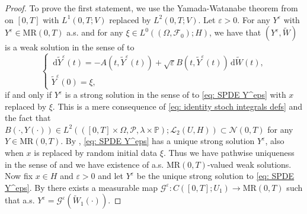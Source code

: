 \documentclass{amsart}
\newcommand{\dd}{\,\mathrm{d}}
\renewcommand{\MR}{\mathrm{MR}}
\newcommand{\UH}{\mathcal{L}_2(U,H)}
\newcommand{\<}{\langle}
\newcommand{\?}{\rangle}
\theoremstyle{plain}
\theoremstyle{remark}
\theoremstyle{plain}
\numberwithin{equation}{section}
\newcommand{\F}{\mathcal{F}}
\renewcommand{\P}{\mathbb{P}}
\newcommand{\PP}{\mathcal{P}}
\newcommand{\Om}{\Omega}
\newcommand{\eps}{\varepsilon}
\begin{document}
\begin{proof}
To prove the first statement, we use the Yamada-Watanabe theorem from \cite[Th. 2.1]{rock08}  on $[0,T]$
with $L^1(0,T;V)$ replaced by $L^2(0,T;V)$.
Let $\eps>0$.  For any $Y^\eps$ with $Y^\eps\in\MR(0,T)$ a.s. \!and for any $\xi\in L^0((\Om,\F_0);H)$, we have that $(Y^\eps, \tilde{W})$ is a weak solution in the sense of \cite[Def. 1.4]{rock08} to
\begin{equation*}
  \begin{cases}
    \dd \tilde{Y}^\eps(t)=-A(t,\tilde{Y}^\eps(t))+\sqrt{\eps}B(t,\tilde{Y}^\eps(t))\dd \tilde{W}(t),\\
    \tilde{Y}^\eps(0)=\xi,
  \end{cases}
\end{equation*}
if and only if $Y^\eps$ is a strong solution in the sense of \cite[Def. 3.2]{AV22variational} to \eqref{eq: SPDE Y^eps} with $x$ replaced by $\xi$. This is a mere consequence of \eqref{eq: identity stoch integrals defs}
and the fact that $B(\cdot,Y(\cdot))\in  L^2(([0,T]\times\Om,\PP,\lambda\times \P);\UH)\subset\mathcal{N}(0,T)$ for any $Y\in \MR(0,T)$. By \cite[Th. 3.5]{AV22variational}, \eqref{eq: SPDE Y^eps} has a unique strong solution $Y^\eps$, also when $x$ is replaced by random initial data $\xi$. Thus we have pathwise uniqueness in the sense of \cite[Def. 1.7]{rock08} and we have existence of a.s. \!$\MR(0,T)$-valued weak solutions.
Now fix $x\in H$ and  $\eps>0$ and let $Y^\eps$ be the unique strong solution to \eqref{eq: SPDE Y^eps}. By \cite[Th. 2.1, Def. 1.9(2), Def. 1.8]{rock08}
there exists a measurable map $\mathcal{G}^\eps\colon C([0,T];U_1)\to \MR(0,T)$ such that a.s.  $Y^\eps=\mathcal{G}^\eps(\tilde{W}_1(\cdot))$.


\end{proof}
\end{document}
